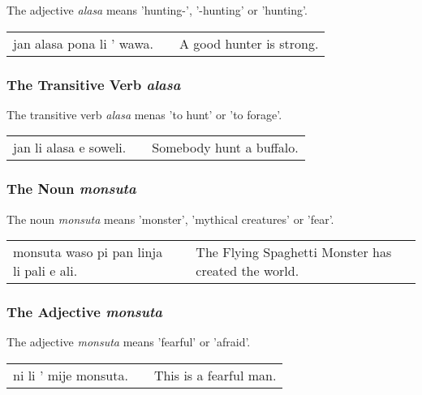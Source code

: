 The adjective \textit{alasa} means 'hunting-', '-hunting' or 'hunting'.

\begin{supertabular}{p{5,5cm}|ll}
jan alasa pona li ' wawa. && A good hunter is strong. \\
\end{supertabular}

%
\subsubsection*{The Transitive Verb \textit{alasa}}
%

The transitive verb \textit{alasa} menas 'to hunt' or 'to forage'.

\begin{supertabular}{p{5,5cm}|ll}
jan li alasa e soweli. && Somebody hunt a buffalo. \\
\end{supertabular}

%
%
\subsubsection*{The Noun \textit{monsuta}}
%

The noun \textit{monsuta} means 'monster', 'mythical creatures' or 'fear'.

\begin{supertabular}{p{5,5cm}|ll}
monsuta waso pi pan linja li pali e ali. &&  The Flying Spaghetti Monster has created the world. \\
\end{supertabular}

%
\subsubsection*{The Adjective \textit{monsuta}}
%

The adjective \textit{monsuta} means 'fearful' or 'afraid'.

\begin{supertabular}{p{5,5cm}|ll}
ni li ' mije monsuta. && This is a fearful man. \\
\end{supertabular}
%
%
%
\newpage
%
